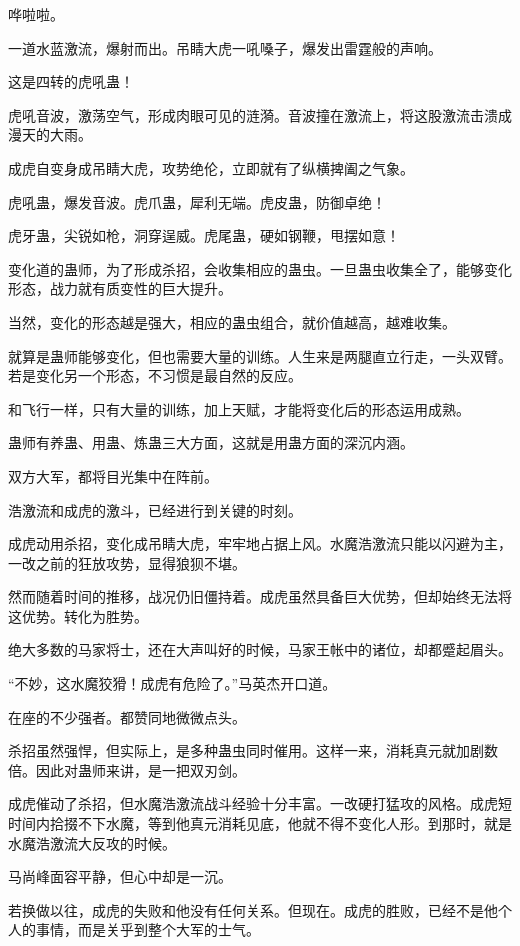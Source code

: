 
\begin{this_body}

哗啦啦。

一道水蓝激流，爆射而出。吊睛大虎一吼嗓子，爆发出雷霆般的声响。

这是四转的虎吼蛊！

虎吼音波，激荡空气，形成肉眼可见的涟漪。音波撞在激流上，将这股激流击溃成漫天的大雨。

成虎自变身成吊睛大虎，攻势绝伦，立即就有了纵横捭阖之气象。

虎吼蛊，爆发音波。虎爪蛊，犀利无端。虎皮蛊，防御卓绝！

虎牙蛊，尖锐如枪，洞穿逞威。虎尾蛊，硬如钢鞭，甩摆如意！

变化道的蛊师，为了形成杀招，会收集相应的蛊虫。一旦蛊虫收集全了，能够变化形态，战力就有质变性的巨大提升。

当然，变化的形态越是强大，相应的蛊虫组合，就价值越高，越难收集。

就算是蛊师能够变化，但也需要大量的训练。人生来是两腿直立行走，一头双臂。若是变化另一个形态，不习惯是最自然的反应。

和飞行一样，只有大量的训练，加上天赋，才能将变化后的形态运用成熟。

蛊师有养蛊、用蛊、炼蛊三大方面，这就是用蛊方面的深沉内涵。

双方大军，都将目光集中在阵前。

浩激流和成虎的激斗，已经进行到关键的时刻。

成虎动用杀招，变化成吊睛大虎，牢牢地占据上风。水魔浩激流只能以闪避为主，一改之前的狂放攻势，显得狼狈不堪。

然而随着时间的推移，战况仍旧僵持着。成虎虽然具备巨大优势，但却始终无法将这优势。转化为胜势。

绝大多数的马家将士，还在大声叫好的时候，马家王帐中的诸位，却都蹙起眉头。

“不妙，这水魔狡猾！成虎有危险了。”马英杰开口道。

在座的不少强者。都赞同地微微点头。

杀招虽然强悍，但实际上，是多种蛊虫同时催用。这样一来，消耗真元就加剧数倍。因此对蛊师来讲，是一把双刃剑。

成虎催动了杀招，但水魔浩激流战斗经验十分丰富。一改硬打猛攻的风格。成虎短时间内拾掇不下水魔，等到他真元消耗见底，他就不得不变化人形。到那时，就是水魔浩激流大反攻的时候。

马尚峰面容平静，但心中却是一沉。

若换做以往，成虎的失败和他没有任何关系。但现在。成虎的胜败，已经不是他个人的事情，而是关乎到整个大军的士气。


\end{this_body}
